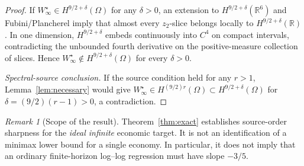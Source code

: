 \documentclass[11pt,a4paper]{article}
\theoremstyle{remark}
\newtheorem{remark}[theorem]{Remark}
\newcommand{\R}{\mathbb R}
\begin{document}
\begin{proof}
If $W_\infty^\star\in H^{9/2+\delta}(\Omega)$ for any $\delta>0$, an extension to $H^{9/2+\delta}(\R^6)$ and Fubini/Plancherel imply that almost every $z_2$-slice belongs locally to $H^{9/2+\delta}(\R)$. In one dimension, $H^{9/2+\delta}$ embeds continuously into $C^4$ on compact intervals, contradicting the unbounded fourth derivative on the positive-measure collection of slices. Hence $W_\infty^\star\notin H^{9/2+\delta}(\Omega)$ for every $\delta>0$.

\textit{Spectral-source conclusion.} If the source condition held for any $r>1$, Lemma~\ref{lem:necessary} would give $W_\infty^\star\in H^{(9/2)r}(\Omega)\subset H^{9/2+\delta}(\Omega)$ for $\delta=(9/2)(r-1)>0$, a contradiction.
\end{proof}

\begin{remark}[Scope of the result]
Theorem~\ref{thm:exact} establishes source-order sharpness for the \emph{ideal infinite} economic target. It is not an identification of a minimax lower bound for a single economy. In particular, it does not imply that an ordinary finite-horizon log--log regression must have slope $-3/5$.
\end{remark}
\end{document}
